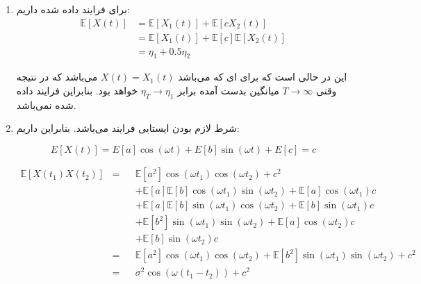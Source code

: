 \begin{enumerate}
	\item
	برای فرایند داده شده داریم:
	$$
	\begin{aligned}
		\mathbb{E}\left[ {X\left( t \right)} \right] & = \mathbb{E}\left[ {{X_1}\left( t \right)} \right] + \mathbb{E}\left[ {c{X_2}\left( t \right)} \right]\\
		& = \mathbb{E}\left[ {{X_1}\left( t \right)} \right] + \mathbb{E}\left[ c \right]\mathbb{E}\left[ {{X_2}\left( t \right)} \right]\\
		& = {\eta _1} + 0.5{\eta _2}
	\end{aligned}
	$$
	
	این در حالی است که برای
	ای که
	می‌باشد
	$X\left( t \right) = {X_1}\left( t \right)$
	می‌باشد که در نتیجه وقتی
	$T \to \infty$
	میانگین بدست آمده برابر
	${\eta _T} \to {\eta _1}$
	خواهد بود. بنابراین فرایند داده شده
	نمی‌باشد.
	
	
	\item
	شرط لازم
	بودن ایستایی فرایند می‌باشد. بنابراین داریم:
	
	$$
	E\left[ {X\left( t \right)} \right] = E\left[ a \right]\cos \left( {\omega t} \right) + E\left[ b \right]\sin \left( {\omega t} \right) + E\left[ c \right] = c
	$$
	
	$$
	\begin{aligned}
		\mathbb{E}\left[ {X\left( {{t_1}} \right)X\left( {{t_2}} \right)} \right] & = && \mathbb{E}\left[ {{a^2}} \right]\cos \left( {\omega {t_1}} \right)\cos \left( {\omega {t_2}} \right) + {c^2}\\
		& && + \mathbb{E}\left[ a \right]\mathbb{E}\left[ b \right]\cos \left( {\omega {t_1}} \right)\sin \left( {\omega {t_2}} \right) + \mathbb{E}\left[ a \right]\cos \left( {\omega {t_1}} \right)c\\
		& && + \mathbb{E}\left[ a \right]\mathbb{E}\left[ b \right]\sin \left( {\omega {t_1}} \right)\cos \left( {\omega {t_2}} \right) + \mathbb{E}\left[ b \right]\sin \left( {\omega {t_1}} \right)c\\
		& && + \mathbb{E}\left[ {{b^2}} \right]\sin \left( {\omega {t_1}} \right)\sin \left( {\omega {t_2}} \right) + \mathbb{E}\left[ a \right]\cos \left( {\omega {t_2}} \right)c\\
		& && + \mathbb{E}\left[ b \right]\sin \left( {\omega {t_2}} \right)c\\
		& = && \mathbb{E}\left[ {{a^2}} \right]\cos \left( {\omega {t_1}} \right)\cos \left( {\omega {t_2}} \right) + \mathbb{E}\left[ {{b^2}} \right]\sin \left( {\omega {t_1}} \right)\sin \left( {\omega {t_2}} \right) + {c^2}\\
		& = && {\sigma ^2}\cos \left( {\omega \left( {{t_1} - {t_2}} \right)} \right) + {c^2}
	\end{aligned}
	$$
	

\end{enumerate}
